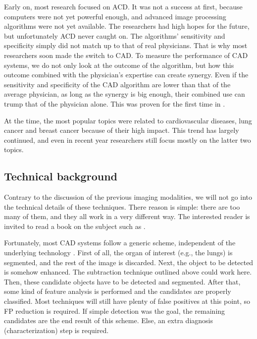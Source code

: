 Early on, most research focused on ACD. It was not a success at first,
because computers were not yet powerful enough, and advanced image processing
algorithms were not yet available. The researchers had high hopes for the
future, but unfortunately ACD never caught on. The algorithms' sensitivity and
specificity simply did not match up to that of real physicians. That is why most
researchers soon made the switch to CAD. To measure the performance of CAD
systems, we do not only look at the outcome of the algorithm, but how this outcome
combined with the physician's expertise can create synergy. Even if the
sensitivity and specificity of the CAD algorithm are lower than that of the
average physician, as long as the synergy is big enough, their combined use can
trump that of the physician alone. This was proven for the first time in
\cite{cadsynergy}.

At the time, the most popular topics were related to cardiovascular diseases,
lung cancer and breast cancer because of their high impact. This trend has
largely continued, and even in recent year researchers still focus mostly on the
latter two topics. \cite{cadhistory}

\subsection{Technical background}
Contrary to the discussion of the previous imaging modalities, we will not go
into the technical details of these techniques. There reason is simple: there
are too many of them, and they all work in a very different way. The interested
reader is invited to read a book on the subject such as \cite{imgprocbook}.

Fortunately, most CAD systems follow a generic scheme, independent of the
underlying technology \cite{lungcadreview}. First of all, the organ of interest
(e.g., the lungs) is segmented, and the rest of the image is discarded. Next,
the object to be detected is somehow enhanced. The subtraction technique outlined
above could work here. Then, these candidate objects have to be detected and
segmented. After that, some kind of feature analysis is performed and the
candidates are properly classified. Most techniques will still have plenty of
false positives at this point, so FP reduction is required. If simple
detection was the goal, the remaining candidates are the end result of this
scheme. Else, an extra diagnosis (characterization) step is required.

